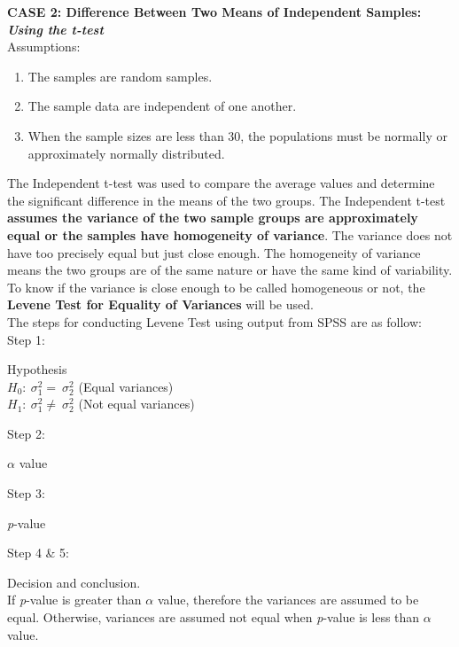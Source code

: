 \documentclass[
  a4paper,
  DIV=11,
  numbers=noendperiod,
  oneside]{scrreprt}
\providecommand{\tightlist}{%
  \setlength{\itemsep}{0pt}\setlength{\parskip}{0pt}}\usepackage{longtable,booktabs,array}
\begin{document}
\textbf{CASE 2: Difference Between Two Means of Independent Samples:
\emph{Using the t-test} }\\

Assumptions:\\

\begin{enumerate}
\def\labelenumi{\arabic{enumi}.}
\tightlist
\item
  The samples are random samples.
\item
  The sample data are independent of one another.
\item
  When the sample sizes are less than 30, the populations must be
  normally or approximately normally distributed.\\
\end{enumerate}

The Independent t-test was used to compare the average values and
determine the significant difference in the means of the two groups. The
Independent t-test \textbf{assumes the variance of the two sample groups
are approximately equal or the samples have homogeneity of variance}.
The variance does not have too precisely equal but just close enough.
The homogeneity of variance means the two groups are of the same nature
or have the same kind of variability. To know if the variance is close
enough to be called homogeneous or not, the \textbf{Levene Test for
Equality of Variances} will be used.\\

The steps for conducting Levene Test using output from SPSS are as
follow:\\

Step 1:

Hypothesis\\
\(H_0:\ \sigma_1^2=\ \sigma_2^2\) (Equal variances)\\
\(H_1:\ \sigma_1^2\ne\ \sigma_2^2\) (Not equal variances)

Step 2:

\(\alpha\) value

Step 3:

\emph{p}-value

Step 4 \& 5:

Decision and conclusion.\\
If \emph{p}-value is greater than \(\alpha\) value, therefore the
variances are assumed to be equal. Otherwise, variances are assumed not
equal when \emph{p}-value is less than \(\alpha\) value.
\end{document}
